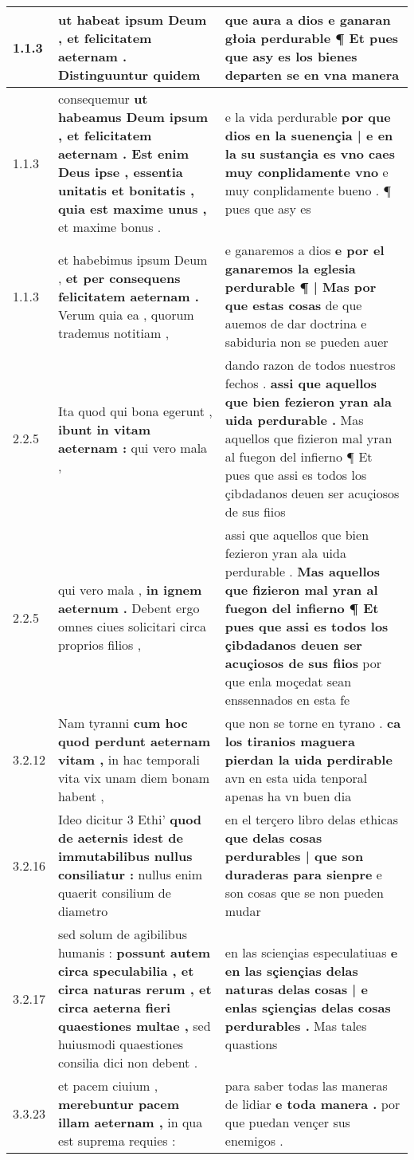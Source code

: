 \begin{tabular}{|p{1cm}|p{6.5cm}|p{6.5cm}|}

\hline
1.1.3 & ut habeat ipsum Deum , \textbf{ et felicitatem aeternam . } Distinguuntur quidem & que aura a dios \textbf{ e ganaran głoia perdurable ¶ } Et pues que asy es los bienes departen se en vna manera \\\hline
1.1.3 & consequemur \textbf{ ut habeamus Deum ipsum , et felicitatem aeternam . Est enim Deus ipse , essentia unitatis et bonitatis , quia est maxime unus , } et maxime bonus . & e la vida perdurable \textbf{ por que dios en la suenençia | e en la su sustançia es vno caes muy conplidamente vno } e muy conplidamente bueno . ¶ pues que asy es \\\hline
1.1.3 & et habebimus ipsum Deum , \textbf{ et per consequens felicitatem aeternam . } Verum quia ea , quorum trademus notitiam , & e ganaremos a dios \textbf{ e por el ganaremos la eglesia perdurable ¶ | Mas por que estas cosas } de que auemos de dar doctrina e sabiduria non se pueden auer \\\hline
2.2.5 & Ita quod qui bona egerunt , \textbf{ ibunt in vitam aeternam : } qui vero mala , & dando razon de todos nuestros fechos . \textbf{ assi que aquellos que bien fezieron yran ala uida perdurable . } Mas aquellos que fizieron mal yran al fuegon del infierno ¶ Et pues que assi es todos los çibdadanos deuen ser acuçiosos de sus fiios \\\hline
2.2.5 & qui vero mala , \textbf{ in ignem aeternum . } Debent ergo omnes ciues solicitari circa proprios filios , & assi que aquellos que bien fezieron yran ala uida perdurable . \textbf{ Mas aquellos que fizieron mal yran al fuegon del infierno ¶ Et pues que assi es todos los çibdadanos deuen ser acuçiosos de sus fiios } por que enla moçedat sean enssennados en esta fe \\\hline
3.2.12 & Nam tyranni \textbf{ cum hoc quod perdunt aeternam vitam , } in hac temporali vita vix unam diem bonam habent , & que non se torne en tyrano . \textbf{ ca los tiranios maguera pierdan la uida perdirable } avn en esta uida tenporal apenas ha vn buen dia \\\hline
3.2.16 & Ideo dicitur 3 Ethi’ \textbf{ quod de aeternis idest de immutabilibus nullus consiliatur : } nullus enim quaerit consilium de diametro & en el terçero libro delas ethicas \textbf{ que delas cosas perdurables | que son duraderas para sienpre } e son cosas que se non pueden mudar \\\hline
3.2.17 & sed solum de agibilibus humanis : \textbf{ possunt autem circa speculabilia , et circa naturas rerum , et circa aeterna fieri quaestiones multae , } sed huiusmodi quaestiones consilia dici non debent . & en las sciençias especulatiuas \textbf{ e en las sçiençias delas naturas delas cosas | e enlas sçiençias delas cosas perdurables . } Mas tales quastions \\\hline
3.3.23 & et pacem ciuium , \textbf{ merebuntur pacem illam aeternam , } in qua est suprema requies : & para saber todas las maneras de lidiar \textbf{ e toda manera . } por que puedan vençer sus enemigos . \\\hline

\end{tabular}
